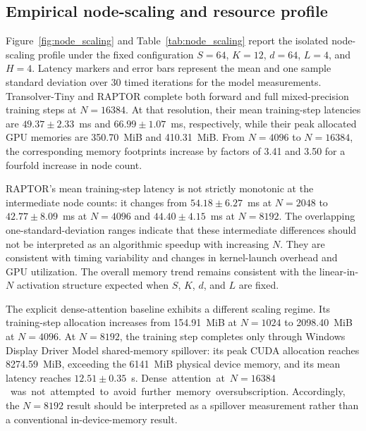 \documentclass[a4paper,fleqn]{cas-sc}
\begin{document}
\subsection{Empirical node-scaling and resource profile}
\label{subsec:node_scaling}

Figure~\ref{fig:node_scaling} and Table~\ref{tab:node_scaling} report the
isolated node-scaling profile under the fixed configuration
\(S=64\), \(K=12\), \(d=64\), \(L=4\), and \(H=4\). Latency markers and
error bars represent the mean and one sample standard deviation over
30 timed iterations for the model measurements. Transolver-Tiny and
RAPTOR complete both forward and full mixed-precision training steps at
\(N=16384\). At that resolution, their mean training-step latencies are
\(49.37\pm2.33\)~ms and \(66.99\pm1.07\)~ms, respectively, while their
peak allocated GPU memories are 350.70~MiB and 410.31~MiB. From
\(N=4096\) to \(N=16384\), the corresponding memory footprints increase
by factors of 3.41 and 3.50 for a fourfold increase in node count.

RAPTOR's mean training-step latency is not strictly monotonic at the
intermediate node counts: it changes from \(54.18\pm6.27\)~ms at
\(N=2048\) to \(42.77\pm8.09\)~ms at \(N=4096\) and
\(44.40\pm4.15\)~ms at \(N=8192\). The overlapping
one-standard-deviation ranges indicate that these intermediate
differences should not be interpreted as an algorithmic speedup with
increasing \(N\). They are consistent with timing variability and
changes in kernel-launch overhead and GPU utilization. The overall
memory trend remains consistent with the linear-in-\(N\) activation
structure expected when \(S\), \(K\), \(d\), and \(L\) are fixed.

The explicit dense-attention baseline exhibits a different scaling
regime. Its training-step allocation increases from 154.91~MiB at
\(N=1024\) to 2098.40~MiB at \(N=4096\). At \(N=8192\), the training
step completes only through Windows Display Driver Model shared-memory
spillover: its peak CUDA allocation reaches 8274.59~MiB, exceeding the
6141~MiB physical device memory, and its mean latency reaches
\(12.51\pm0.35\)~s. \mbox{Dense attention at \(N=16384\) was not attempted
to avoid further memory oversubscription.} Accordingly, the
\(N=8192\) result should be interpreted as a spillover measurement
rather than a conventional in-device-memory result.
\end{document}

